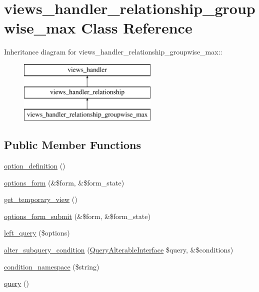 \hypertarget{classviews__handler__relationship__groupwise__max}{
\section{views\_\-handler\_\-relationship\_\-groupwise\_\-max Class Reference}
\label{classviews__handler__relationship__groupwise__max}
}
Inheritance diagram for views\_\-handler\_\-relationship\_\-groupwise\_\-max::\begin{figure}[H]
\begin{center}
\leavevmode
\includegraphics[height=3cm]{classviews__handler__relationship__groupwise__max}
\end{center}
\end{figure}
\subsection*{Public Member Functions}
\begin{DoxyCompactItemize}
\item 
\hyperlink{classviews__handler__relationship__groupwise__max_a915d653a4dd09cc8968c616427a87f92}{option\_\-definition} ()
\item 
\hyperlink{classviews__handler__relationship__groupwise__max_a9cac8b627e41265e500d1a36f4d8f621}{options\_\-form} (\&\$form, \&\$form\_\-state)
\item 
\hyperlink{classviews__handler__relationship__groupwise__max_a2af65fae1b0d97331ccf817be451399c}{get\_\-temporary\_\-view} ()
\item 
\hyperlink{classviews__handler__relationship__groupwise__max_a33dd614a3c4506afe9a3746712713724}{options\_\-form\_\-submit} (\&\$form, \&\$form\_\-state)
\item 
\hyperlink{classviews__handler__relationship__groupwise__max_af16a972d2e2cccfc5d56495c9e15f42f}{left\_\-query} (\$options)
\item 
\hyperlink{classviews__handler__relationship__groupwise__max_a70411d08b3516619b376be6b3411d70c}{alter\_\-subquery\_\-condition} (\hyperlink{interfaceQueryAlterableInterface}{QueryAlterableInterface} \$query, \&\$conditions)
\item 
\hyperlink{classviews__handler__relationship__groupwise__max_af6f3f64602d39ea3f4620f06534c5779}{condition\_\-namespace} (\$string)
\item 
\hyperlink{classviews__handler__relationship__groupwise__max_a26fd71d0c45deea3dcd04e40fe58df7c}{query} ()
\end{DoxyCompactItemize}


